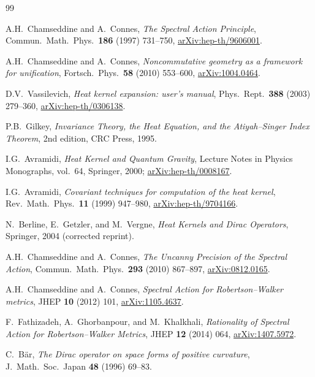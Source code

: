 \documentclass[11pt,a4paper]{article}
\theoremstyle{plain}
\theoremstyle{definition}
\begin{document}
\begin{thebibliography}{99}

A.H.~Chamseddine and A.~Connes,
\textit{The Spectral Action Principle},
Commun.\ Math.\ Phys.\ \textbf{186} (1997) 731--750,
\href{https://arxiv.org/abs/hep-th/9606001}{arXiv:hep-th/9606001}.

A.H.~Chamseddine and A.~Connes,
\textit{Noncommutative geometry as a framework for unification},
Fortsch.\ Phys.\ \textbf{58} (2010) 553--600,
\href{https://arxiv.org/abs/1004.0464}{arXiv:1004.0464}.

D.V.~Vassilevich,
\textit{Heat kernel expansion: user's manual},
Phys.\ Rept.\ \textbf{388} (2003) 279--360,
\href{https://arxiv.org/abs/hep-th/0306138}{arXiv:hep-th/0306138}.

P.B.~Gilkey,
\textit{Invariance Theory, the Heat Equation, and the Atiyah--Singer
Index Theorem}, 2nd edition, CRC Press, 1995.

I.G.~Avramidi,
\textit{Heat Kernel and Quantum Gravity},
Lecture Notes in Physics Monographs, vol.~64, Springer, 2000;
\href{https://arxiv.org/abs/hep-th/0008167}{arXiv:hep-th/0008167}.

I.G.~Avramidi,
\textit{Covariant techniques for computation of the heat kernel},
Rev.\ Math.\ Phys.\ \textbf{11} (1999) 947--980,
\href{https://arxiv.org/abs/hep-th/9704166}{arXiv:hep-th/9704166}.

N.~Berline, E.~Getzler, and M.~Vergne,
\textit{Heat Kernels and Dirac Operators},
Springer, 2004 (corrected reprint).

A.H.~Chamseddine and A.~Connes,
\textit{The Uncanny Precision of the Spectral Action},
Commun.\ Math.\ Phys.\ \textbf{293} (2010) 867--897,
\href{https://arxiv.org/abs/0812.0165}{arXiv:0812.0165}.

A.H.~Chamseddine and A.~Connes,
\textit{Spectral Action for Robertson--Walker metrics},
JHEP \textbf{10} (2012) 101,
\href{https://arxiv.org/abs/1105.4637}{arXiv:1105.4637}.

F.~Fathizadeh, A.~Ghorbanpour, and M.~Khalkhali,
\textit{Rationality of Spectral Action for Robertson--Walker Metrics},
JHEP \textbf{12} (2014) 064,
\href{https://arxiv.org/abs/1407.5972}{arXiv:1407.5972}.

C.~B\"{a}r,
\textit{The Dirac operator on space forms of positive curvature},
J.\ Math.\ Soc.\ Japan \textbf{48} (1996) 69--83.


\end{thebibliography}
\end{document}
